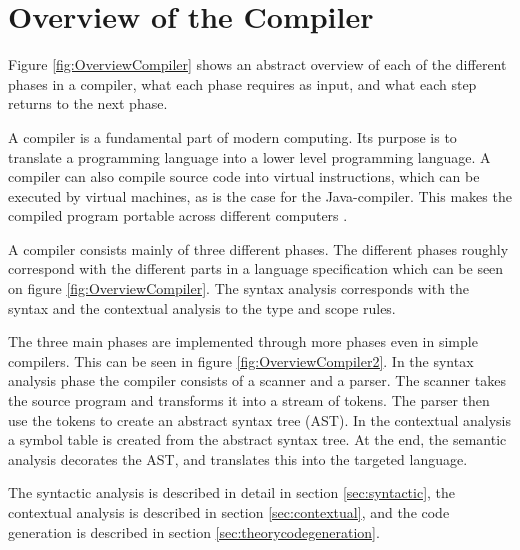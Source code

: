 \section{Overview of the Compiler}
\label{sec:OverviewCompiler}
Figure \ref{fig:OverviewCompiler} shows an abstract overview of each of the different phases in a compiler, what each phase requires as input, and what each step returns to the next phase.

A compiler is a fundamental part of modern computing. Its purpose is to translate a programming language into a lower level programming language. A compiler can also compile source code into virtual instructions, which can be executed by virtual machines, as is the case for the Java-compiler. This makes the compiled program portable across different computers \citep{CraftingACompiler}.

A compiler consists mainly of three different phases. The different phases roughly correspond with the different parts in a language specification which can be seen on figure \ref{fig:OverviewCompiler}. The syntax analysis corresponds with the syntax and the contextual analysis to the type and scope rules.

The three main phases are implemented through more phases even in simple compilers. This can be seen in figure \ref{fig:OverviewCompiler2}. In the syntax analysis phase the compiler consists of a scanner and a parser. The scanner takes the source program and transforms it into a stream of tokens. The parser then use the tokens to create an abstract syntax tree (AST). In the contextual analysis a symbol table is created from the abstract syntax tree. At the end, the semantic analysis decorates the AST, and translates this into the targeted language.

The syntactic analysis is described in detail in section \ref{sec:syntactic}, the contextual analysis is described in section \ref{sec:contextual}, and the code generation is described in section \ref{sec:theorycodegeneration}.

